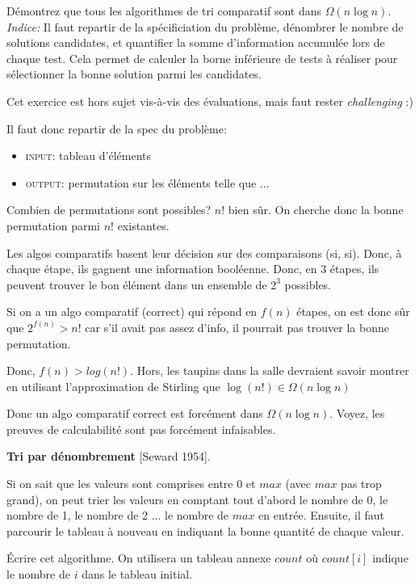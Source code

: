 \documentclass[10pt]{article}\usepackage[correction]{esial}
\begin{document}
\Question Démontrez que tous les algorithmes de tri comparatif sont dans
$\Omega(n\log n)$. \\
\noindent \textit{Indice:} Il faut repartir de la spécificiation du problème,
dénombrer le nombre de solutions candidates, et quantifier la somme
d'information accumulée lors de chaque test. Cela permet de calculer la borne
inférieure de tests à réaliser pour sélectionner la bonne solution parmi les
candidates. 
\begin{Reponse}
  Cet exercice est hors sujet vis-à-vis des évaluations, mais faut rester
  \textit{challenging} :)

  Il faut donc repartir de la spec du problème:
  \begin{itemize}
  \item \textsc{input}: tableau d'éléments
  \item \textsc{output}: permutation sur les éléments telle que ...
  \end{itemize}

  Combien de permutations sont possibles? $n!$ bien sûr. On cherche donc la
  bonne permutation parmi $n!$ existantes.

  Les algos comparatifs basent leur décision sur des comparaisons (si,
  si). Donc, à chaque étape, ils gagnent une information booléenne. Donc, en 3
  étapes, ils peuvent trouver le bon élément dans un ensemble de $2^3$
  possibles.

  Si on a un algo comparatif (correct) qui répond en $f(n)$ étapes, on est donc
  sûr que $2^{f(n)}>n!$ car s'il avait pas assez d'info, il pourrait pas
  trouver la bonne permutation. 

  Donc, $f(n)>log(n!)$. Hors, les taupins dans la salle devraient savoir
  montrer en utilisant l'approximation de Stirling que 
  $\log(n!)\in\Omega(n\log n)$

  Donc un algo comparatif correct est forcément dans $\Omega(n\log n)$. Voyez,
  les preuves de calculabilité sont pas forcément infaisables.
\end{Reponse}

\Exercice \textbf{Tri par dénombrement} [Seward 1954].

Si on sait que les valeurs sont comprises entre 0 et $max$ (avec $max$
pas trop grand), on peut trier les valeurs en comptant tout d'abord le nombre
de 0, le nombre de 1, le nombre de 2 ... le nombre de $max$ en entrée. Ensuite,
il faut parcourir le tableau à nouveau en indiquant la bonne quantité de
chaque valeur.

\Question Écrire cet algorithme. On utilisera un tableau annexe $count$ où
$count[i]$ indique le nombre de $i$ dans le tableau initial.
\end{document}
